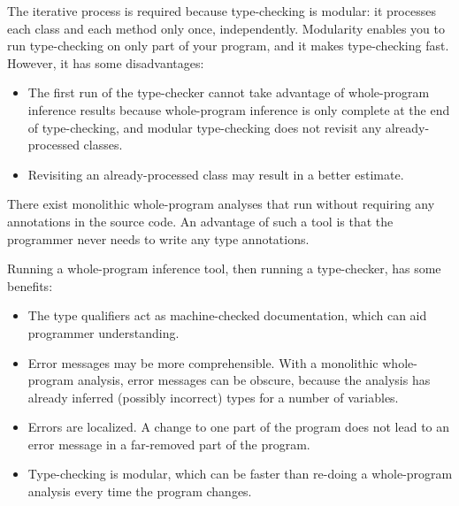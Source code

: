 The iterative process is required because type-checking is modular:  it
processes each class and each method only once, independently.  Modularity
enables you to run type-checking on only part of your program, and it makes
type-checking fast.  However, it has some disadvantages:
\begin{itemize}
\item
  The first run of the type-checker cannot take advantage of whole-program
  inference results because whole-program inference is only complete at the
  end of type-checking, and modular type-checking does not revisit any
  already-processed classes.
\item
  Revisiting an
  already-processed class may result in a better estimate.
\end{itemize}



There exist monolithic whole-program analyses that run without requiring any
annotations in the source code.  An advantage of such a tool is that the
programmer never needs to write any type annotations.

Running a whole-program inference tool, then running a type-checker, has
some benefits:
\begin{itemize}
\item
  The type qualifiers act as machine-checked documentation,
  which can aid programmer understanding.
\item
  Error messages may be more comprehensible.  With a monolithic
  whole-program analysis, error messages can be obscure, because the
  analysis has already inferred (possibly incorrect) types for a number of
  variables.
\item
  Errors are localized.  A change to one part of the program does not lead
  to an error message in a far-removed part of the program.
\item
  Type-checking is modular, which can be faster than re-doing a
  whole-program analysis every time the program changes.
\end{itemize}



